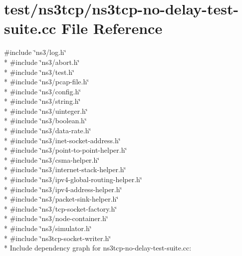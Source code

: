 \hypertarget{ns3tcp-no-delay-test-suite_8cc}{}\section{test/ns3tcp/ns3tcp-\/no-\/delay-\/test-\/suite.cc File Reference}
\label{ns3tcp-no-delay-test-suite_8cc}
{\ttfamily \#include \char`\"{}ns3/log.\+h\char`\"{}}\\*
{\ttfamily \#include \char`\"{}ns3/abort.\+h\char`\"{}}\\*
{\ttfamily \#include \char`\"{}ns3/test.\+h\char`\"{}}\\*
{\ttfamily \#include \char`\"{}ns3/pcap-\/file.\+h\char`\"{}}\\*
{\ttfamily \#include \char`\"{}ns3/config.\+h\char`\"{}}\\*
{\ttfamily \#include \char`\"{}ns3/string.\+h\char`\"{}}\\*
{\ttfamily \#include \char`\"{}ns3/uinteger.\+h\char`\"{}}\\*
{\ttfamily \#include \char`\"{}ns3/boolean.\+h\char`\"{}}\\*
{\ttfamily \#include \char`\"{}ns3/data-\/rate.\+h\char`\"{}}\\*
{\ttfamily \#include \char`\"{}ns3/inet-\/socket-\/address.\+h\char`\"{}}\\*
{\ttfamily \#include \char`\"{}ns3/point-\/to-\/point-\/helper.\+h\char`\"{}}\\*
{\ttfamily \#include \char`\"{}ns3/csma-\/helper.\+h\char`\"{}}\\*
{\ttfamily \#include \char`\"{}ns3/internet-\/stack-\/helper.\+h\char`\"{}}\\*
{\ttfamily \#include \char`\"{}ns3/ipv4-\/global-\/routing-\/helper.\+h\char`\"{}}\\*
{\ttfamily \#include \char`\"{}ns3/ipv4-\/address-\/helper.\+h\char`\"{}}\\*
{\ttfamily \#include \char`\"{}ns3/packet-\/sink-\/helper.\+h\char`\"{}}\\*
{\ttfamily \#include \char`\"{}ns3/tcp-\/socket-\/factory.\+h\char`\"{}}\\*
{\ttfamily \#include \char`\"{}ns3/node-\/container.\+h\char`\"{}}\\*
{\ttfamily \#include \char`\"{}ns3/simulator.\+h\char`\"{}}\\*
{\ttfamily \#include \char`\"{}ns3tcp-\/socket-\/writer.\+h\char`\"{}}\\*
Include dependency graph for ns3tcp-\/no-\/delay-\/test-\/suite.cc\+:
